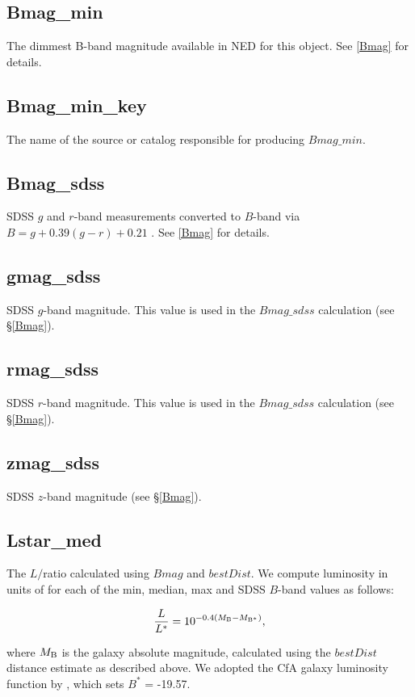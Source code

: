 \subsection{Bmag\_min}
The dimmest B-band magnitude available in NED for this object. See \ref{Bmag} for details.

\subsection{Bmag\_min\_key}
The name of the source or catalog responsible for producing $Bmag\_min$.

\subsection{Bmag\_sdss} \label{Bmag_sdss}
SDSS $g$ and $r$-band measurements converted to $B$-band via $B = g + 0.39 (g-r) + 0.21$ \citep{jester2005}. See \ref{Bmag} for details.

\subsection{gmag\_sdss}
SDSS $g$-band magnitude. This value is used in the $Bmag\_sdss$ calculation (see \S \ref{Bmag}).

\subsection{rmag\_sdss}
SDSS $r$-band magnitude. This value is used in the $Bmag\_sdss$ calculation (see \S \ref{Bmag}).

\subsection{zmag\_sdss}
SDSS $z$-band magnitude (see \S \ref{Bmag}).

\subsection{Lstar\_med} \label{Lstar_med}
The $L / $\Lstar ratio calculated using $Bmag$ and $bestDist$. We compute luminosity in units of \Lstar for each of the min, median, max and SDSS $B$-band values as follows:

\begin{equation}
	\frac{L}{L^*} = 10^{-0.4 (M_{\rm B} - M_{\rm B^{*}})},
	\label{lstar}
\end{equation}

\noindent where $M_{\rm B}$ is the galaxy absolute magnitude, calculated using the $bestDist$ distance estimate as described above. We adopted the CfA galaxy luminosity function by \citep{marzke1994}, which sets $B^{*} $ = -19.57. 


